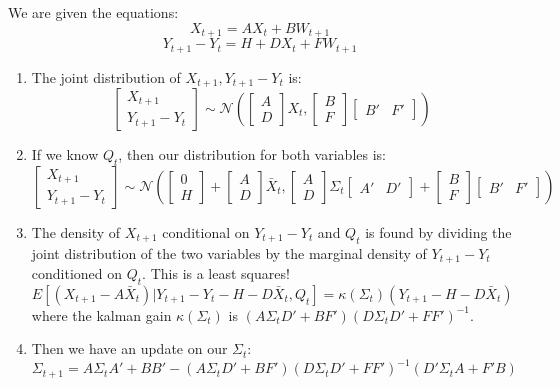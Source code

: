 \begin{frame}
We are given the equations:
$$X_{t+1}=AX_t+BW_{t+1}$$
$$Y_{t+1}-Y_t=H+DX_t+FW_{t+1}$$

\begin{enumerate}
\item The joint distribution of $X_{t+1},Y_{t+1}-Y_t$ is:
$$\left[\begin{array}{c} X_{t+1} \\ Y_{t+1}-Y_t \end{array}\right]\sim\mathcal{N}\left(\left[\begin{array}{c}A \\ D\end{array}\right]X_t,\left[\begin{array}{c}B \\ F\end{array}\right]\left[\begin{array}{cc}B' & F'\end{array}\right]\right)$$
\item If we know $Q_t$, then our distribution for both variables is:
$$\left[\begin{array}{c} X_{t+1} \\ Y_{t+1}-Y_t \end{array}\right]\sim\mathcal{N}\left(\left[\begin{array}{c}0 \\ H\end{array}\right]+\left[\begin{array}{c}A \\ D\end{array}\right]\bar{X}_t,\left[\begin{array}{c}A \\ D\end{array}\right]\Sigma_t\left[\begin{array}{cc} A' & D' \end{array}\right]+\left[\begin{array}{c}B \\ F\end{array}\right]\left[\begin{array}{cc}B' & F'\end{array}\right]\right)$$
\item The density of $X_{t+1}$ conditional on $Y_{t+1}-Y_t$ and $Q_t$ is found by dividing the joint distribution of the two variables by the marginal density of $Y_{t+1}-Y_t$ conditioned on $Q_t$.  This is a least squares!
$$E[(X_{t+1}-A\bar{X}_t)|Y_{t+1}-Y_t-H-D\bar{X}_t,Q_t]=\mathcal{\kappa}(\Sigma_t)(Y_{t+1}-H-D\bar{X}_t)$$
where the kalman gain $\mathcal{\kappa}(\Sigma_t)$ is $(A\Sigma_t D'+BF')(D\Sigma_tD'+FF')^{-1}$.
\item Then we have an update on our $\Sigma_t$:
$$\Sigma_{t+1}=A\Sigma_tA'+BB'-(A\Sigma_tD'+BF')(D\Sigma_tD'+FF')^{-1}(D'\Sigma_tA+F'B)$$
\end{enumerate}
\end{frame}
